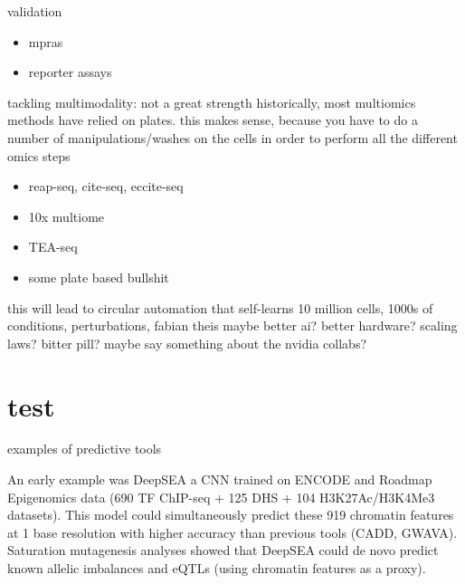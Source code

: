 validation
\begin{itemize}
    \item mpras
    \item reporter assays
\end{itemize}

tackling multimodality: not a great strength
historically, most multiomics methods have relied on plates. this makes sense, because you have to do a number of manipulations/washes on the cells in order to perform all the different omics steps
\begin{itemize}
    \item reap-seq, cite-seq, eccite-seq
    \item 10x multiome
    \item TEA-seq
    \item some plate based bullshit
\end{itemize}


this will lead to circular automation that self-learns
10 million cells, 1000s of conditions, perturbations, fabian theis
maybe better ai? better hardware? scaling laws? bitter pill?
maybe say something about the nvidia collabs?

\section{test}

examples of predictive tools

An early example was DeepSEA a CNN trained on ENCODE and Roadmap Epigenomics data (690 TF ChIP-seq + 125 DHS + 104 H3K27Ac/H3K4Me3 datasets). This model could simultaneously predict these 919 chromatin features at 1 base resolution with higher accuracy than previous tools (CADD, GWAVA). Saturation mutagenesis analyses showed that DeepSEA could de novo predict known allelic imbalances and eQTLs (using chromatin features as a proxy).


